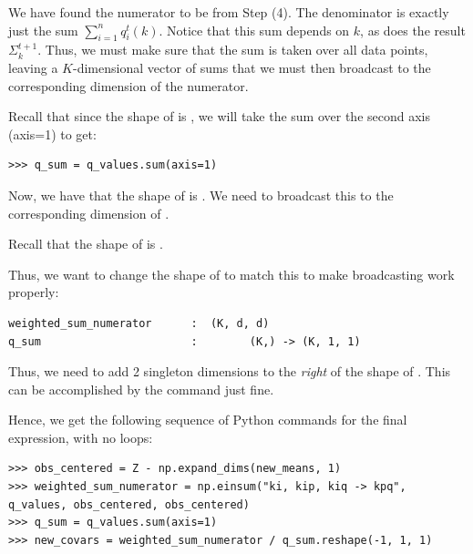 \begin{itemize}
We have found the numerator to be  from Step (4).
The denominator is exactly just the sum $\sum_{i=1}^{n} q_i^t(k)$.
Notice that this sum depends on $k$, as does the result $\Sigma_k^{t+1}$.
Thus, we must make sure that the sum is taken over all data points, leaving a $K$-dimensional vector of sums that we must then broadcast to the corresponding dimension of the numerator.

Recall that since the shape of  is , we will take the sum over the second axis (axis=1) to get:
\begin{lstlisting}
>>> q_sum = q_values.sum(axis=1)
\end{lstlisting}

Now, we have that the shape of  is .
We need to broadcast this to the corresponding dimension of .

Recall that the shape of  is .

Thus, we want to change the shape of  to match this to make broadcasting work properly:
\begin{lstlisting}
weighted_sum_numerator		:  (K, d, d)
q_sum 						:        (K,) -> (K, 1, 1)
\end{lstlisting}
Thus, we need to add 2 singleton dimensions to the \emph{right} of the shape of .
This can be accomplished by the  command just fine.

Hence, we get the following sequence of Python commands for the final expression, with no loops:
\begin{lstlisting}
>>> obs_centered = Z - np.expand_dims(new_means, 1)
>>> weighted_sum_numerator = np.einsum("ki, kip, kiq -> kpq", q_values, obs_centered, obs_centered)
>>> q_sum = q_values.sum(axis=1)
>>> new_covars = weighted_sum_numerator / q_sum.reshape(-1, 1, 1)
\end{lstlisting}


\end{itemize}

